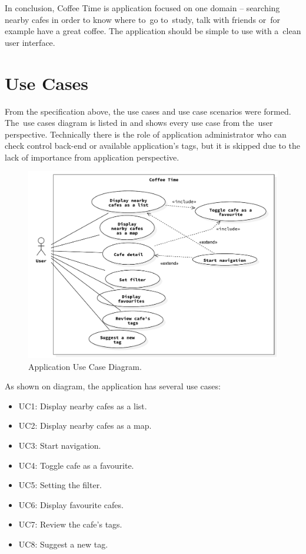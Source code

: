 In conclusion, Coffee Time is application focused on one domain -- searching nearby cafes in order to know where to~go to~study, talk with friends or~for example have a great coffee. The application should be simple to use with a~clean user interface. 
\section{Use Cases}
From the specification above, the use cases and use case scenarios were formed. The~use cases diagram is listed in  and shows every use case from the~user perspective. Technically there is the role of application administrator who can check control back-end or available application's tags, but it is skipped due to the lack of importance from application perspective. 

\begin{figure}[htp]
    \centering
    \includegraphics[width=\linewidth]{img/analysis/use_case.pdf}
    \caption{Application Use Case Diagram.}
    \label{fig:use_case}
\end{figure}

As shown on diagram, the application has several use cases:

\begin{itemize}
    \item UC1: Display nearby cafes as a list.
    \item UC2: Display nearby cafes as a map.
    \item UC3: Start navigation.
    \item UC4: Toggle cafe as a favourite.
    \item UC5: Setting the filter.
    \item UC6: Display favourite cafes.
    \item UC7: Review the cafe's tags.
    \item UC8: Suggest a new tag.
\end{itemize}

